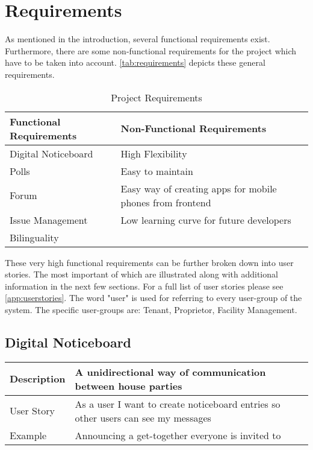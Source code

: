 \section{Requirements} \label{sec:requirements}
As mentioned in the introduction, several functional requirements exist. Furthermore, there are some non-functional requirements for the project which have to be taken into account. \autoref{tab:requirements} depicts these general requirements. \newline

\begin{table}[H]
    \begin{center}
      \begin{tabularx}{\linewidth}{l|l} %
        \textbf{Functional Requirements} & \textbf{Non-Functional Requirements}\\
        \hline
        Digital Noticeboard & High Flexibility \\
        Polls & Easy to maintain\\
        Forum & Easy way of creating apps for mobile phones from frontend\\
        Issue Management & Low learning curve for future developers\\
        Bilinguality & \\
      \end{tabularx}
      \caption{Project Requirements}
      \label{tab:requirements}
    \end{center}
  \end{table}

These very high functional requirements can be further broken down into user stories. The most important of which are illustrated along with additional information in the next few sections. For a full list of user stories please see \autoref{app:userstories}. The word "user" is used for referring to every user-group of the system. The specific user-groups are: Tenant, Proprietor, Facility Management.

\subsection{Digital Noticeboard}
\begin{table}[H]
  \begin{tabularx}{\linewidth}{l|X}
     Description & A unidirectional way of communication between house parties \\
     \hline
     User Story &  As a user I want to create noticeboard entries so other users can see my messages \\
     \hline
     Example & Announcing a get-together everyone is invited to 
  \end{tabularx}
\end{table}

